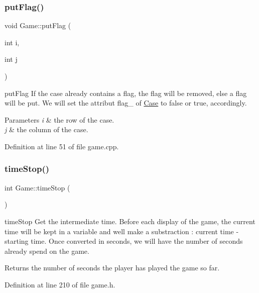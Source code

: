 \subsubsection{\texorpdfstring{put\+Flag()}{putFlag()}}
{\footnotesize\ttfamily void Game\+::put\+Flag (\begin{DoxyParamCaption}\item[{int}]{i,  }\item[{int}]{j }\end{DoxyParamCaption})}



put\+Flag If the case already contains a flag, the flag will be removed, else a flag will be put. We will set the attribut flag\+\_\+ of \hyperlink{class_case}{Case} to false or true, accordingly. 


\begin{DoxyParams}{Parameters}
{\em i} & the row of the case. \\
\hline
{\em j} & the column of the case. \\
\hline
\end{DoxyParams}


Definition at line 51 of file game.\+cpp.

\mbox{\label{class_game_aba2ee6adbc00f4ec492705ecaf48998a}} 
\subsubsection{\texorpdfstring{time\+Stop()}{timeStop()}}
{\footnotesize\ttfamily int Game\+::time\+Stop (\begin{DoxyParamCaption}{ }\end{DoxyParamCaption})\hspace{0.3cm}{\ttfamily [inline]}}



time\+Stop Get the intermediate time. Before each display of the game, the current time will be kept in a variable and we\textquotesingle{}ll make a substraction \+: current time -\/ starting time. Once converted in seconds, we will have the number of seconds already spend on the game. 

\begin{DoxyReturn}{Returns}
the number of seconds the player has played the game so far. 
\end{DoxyReturn}


Definition at line 210 of file game.\+h.

